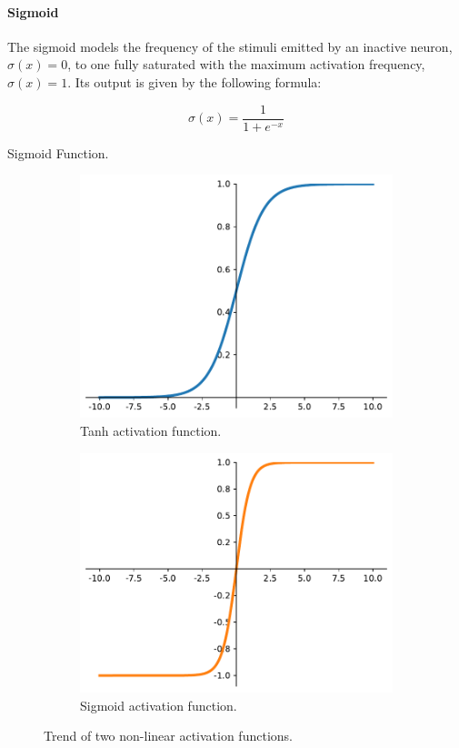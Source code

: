 \paragraph*{Sigmoid}
The sigmoid models the frequency of the stimuli emitted by an inactive neuron, 
$\sigma(x)=0$, to one fully saturated with the maximum activation frequency, 
$\sigma(x)=1$. Its  output is given by the following formula:
\begin{Equation}[H]
	\centering
	\begin{equation}
	\sigma(x)= \frac{1}{1 + e^{-x}}
	\end{equation}
	\caption{Sigmoid Function.}
	\label{eq:sigmoid}
\end{Equation}

\begin{figure}[!htb]
	\begin{center}
		\begin{subfigure}[h]{0.495\textwidth}
			\includegraphics[width=.8\textwidth]{contents/images/sigmoid2}
			\caption{Tanh activation function.}
		\end{subfigure}
		\hfill
		\begin{subfigure}[h]{0.495\textwidth}
			\includegraphics[width=.8\textwidth]{contents/images/tanh2}
			\caption{Sigmoid activation function.}
		\end{subfigure}
	\end{center}
	\caption{Trend of two non-linear activation functions.}
	\label{fig:activation}
\end{figure}

